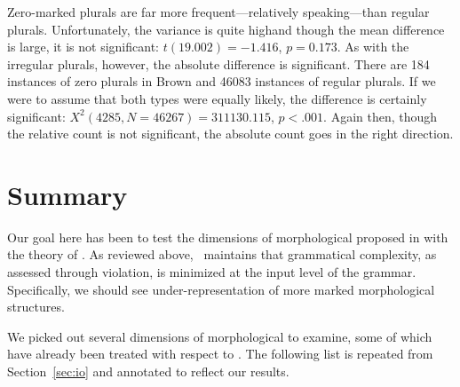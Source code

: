 \documentclass[output=paper,
modfonts
]{LSP/langsci}
\begin{document}
Zero-marked plurals are far more frequent---relatively speaking---than regular plurals. Unfortunately, the variance is quite highand though the mean difference is large, it is not significant: $t(19.002) = -1.416$, $p =  0.173$. As with the irregular plurals, however, the absolute difference is significant. There are 184 instances of zero plurals in Brown and 46083 instances of regular plurals. If we were to assume that both types were equally likely, the difference is certainly significant: $X^2(4285, N = 46267) = 311130.115$, $p < .001$. Again then, though the relative count is not significant, the absolute count goes in the right direction.

\section{Summary}

Our goal here has been to test the dimensions of morphological  proposed in \citet{dimensions} with the theory of \io. As reviewed above, \io\ maintains that grammatical complexity, as assessed through  violation, is minimized at the input level of the grammar. Specifically, we should see under-representation of more marked morphological structures.

We picked out several dimensions of morphological  to examine, some of which have already been treated with respect to \io. The following list is repeated from Section~\ref{sec:io} and annotated to reflect our results.
\end{document}

